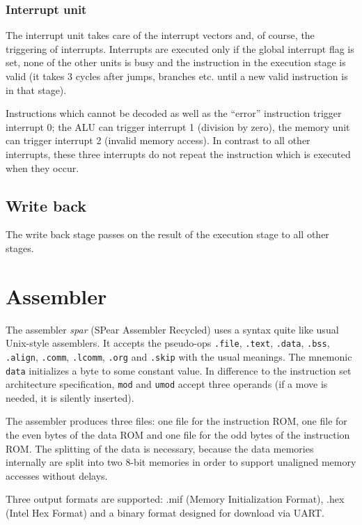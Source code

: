 \documentclass[10pt, twoside, a4paper]{article}
\begin{document}
  \subsubsection{Interrupt unit}
  The interrupt unit takes care of the interrupt vectors and, of
  course, the triggering of interrupts. Interrupts are executed only
  if the global interrupt flag is set, none of the other units is busy
  and the instruction in the execution stage is valid (it takes 3
  cycles after jumps, branches etc. until a new valid instruction is
  in that stage).

  Instructions which cannot be decoded as well as the ``error''
  instruction trigger interrupt 0; the ALU can trigger interrupt 1
  (division by zero), the memory unit can trigger interrupt 2 (invalid
  memory access). In contrast to all other interrupts, these three
  interrupts do not repeat the instruction which is executed when they
  occur.

  \subsection{Write back}
  The write back stage passes on the result of the execution stage to
  all other stages.

  \section{Assembler}
  The assembler \textsl{spar} (SPear Assembler Recycled) uses a syntax
  quite like usual Unix-style assemblers. It accepts the pseudo-ops
  \texttt{.file}, \texttt{.text}, \texttt{.data}, \texttt{.bss},
  \texttt{.align}, \texttt{.comm}, \texttt{.lcomm}, \texttt{.org} and
  \texttt{.skip} with the usual meanings. The mnemonic \texttt{data}
  initializes a byte to some constant value. In difference to the
  instruction set architecture specification, \texttt{mod} and
  \texttt{umod} accept three operands (if a move is needed, it is
  silently inserted).

  The assembler produces three files: one file for the instruction
  ROM, one file for the even bytes of the data ROM and one file for
  the odd bytes of the instruction ROM. The splitting of the data is
  necessary, because the data memories internally are split into two
  8-bit memories in order to support unaligned memory accesses without
  delays.

  Three output formats are supported: .mif (Memory Initialization
  Format), .hex (Intel Hex Format) and a binary format designed for
  download via UART.
\end{document}

